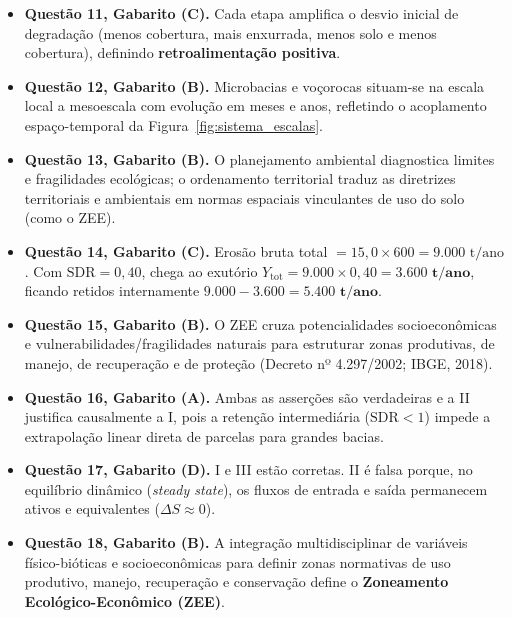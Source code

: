 \begin{boxGabarito}
  \begin{itemize}[leftmargin=1.5em, itemsep=3.5pt]
    \item \textbf{Questão 11, Gabarito (C).} Cada etapa amplifica o desvio inicial de degradação (menos cobertura, mais enxurrada, menos solo e menos cobertura), definindo \textbf{retroalimentação positiva}.
    \item \textbf{Questão 12, Gabarito (B).} Microbacias e voçorocas situam-se na escala local a mesoescala com evolução em meses e anos, refletindo o acoplamento espaço-temporal da Figura~\ref{fig:sistema_escalas}.
    \item \textbf{Questão 13, Gabarito (B).} O planejamento ambiental diagnostica limites e fragilidades ecológicas; o ordenamento territorial traduz as diretrizes territoriais e ambientais em normas espaciais vinculantes de uso do solo (como o ZEE).
    \item \textbf{Questão 14, Gabarito (C).} Erosão bruta total $= 15{,}0 \times 600 = 9.000\text{ t/ano}$. Com $\text{SDR} = 0{,}40$, chega ao exutório $Y_{\text{tot}} = 9.000 \times 0{,}40 = \mathbf{3.600\text{ t/ano}}$, ficando retidos internamente $9.000 - 3.600 = \mathbf{5.400\text{ t/ano}}$.
    \item \textbf{Questão 15, Gabarito (B).} O ZEE cruza potencialidades socioeconômicas e vulnerabilidades/fragilidades naturais para estruturar zonas produtivas, de manejo, de recuperação e de proteção (Decreto nº 4.297/2002; IBGE, 2018).
    \item \textbf{Questão 16, Gabarito (A).} Ambas as asserções são verdadeiras e a II justifica causalmente a I, pois a retenção intermediária ($\text{SDR} < 1$) impede a extrapolação linear direta de parcelas para grandes bacias.
    \item \textbf{Questão 17, Gabarito (D).} I e III estão corretas. II é falsa porque, no equilíbrio dinâmico (\textit{steady state}), os fluxos de entrada e saída permanecem ativos e equivalentes ($\Delta S \approx 0$).
    \item \textbf{Questão 18, Gabarito (B).} A integração multidisciplinar de variáveis físico-bióticas e socioeconômicas para definir zonas normativas de uso produtivo, manejo, recuperação e conservação define o \textbf{Zoneamento Ecológico-Econômico (ZEE)}.
  \end{itemize}
\end{boxGabarito}

